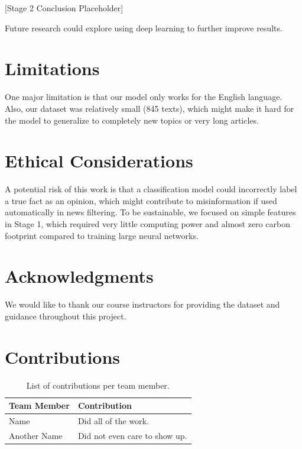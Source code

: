 \documentclass[12pt,a4paper,twocolumn]{article}
\begin{document}
[Stage 2 Conclusion Placeholder]

Future research could explore using deep learning to further improve results.


\newpage

\section*{Limitations}
One major limitation is that our model only works for the English language. Also, our dataset was relatively small (845 texts), which might make it hard for the model to generalize to completely new topics or very long articles.

\section*{Ethical Considerations}
A potential risk of this work is that a classification model could incorrectly label a true fact as an opinion, which might contribute to misinformation if used automatically in news filtering. To be sustainable, we focused on simple features in Stage 1, which required very little computing power and almost zero carbon footprint compared to training large neural networks.


\section*{Acknowledgments}
We would like to thank our course instructors for providing the dataset and guidance throughout this project.

\section*{Contributions}
\begin{table}[h!]
    \centering
    \caption{List of contributions per team member.}
    \label{tab:contributions}
    \begin{tabular}{lp{4cm}}
        \toprule
        \textbf{Team Member} & \textbf{Contribution} \\
        \midrule
        Name            & Did all of the work.             \\
        Another Name    & Did not even care to show up.    \\
        \bottomrule
    \end{tabular}
\end{table}
\end{document}
